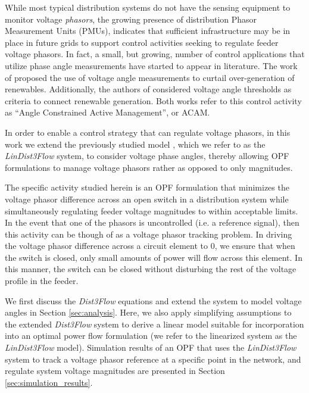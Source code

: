 While most typical distribution systems do not have the sensing equipment to monitor voltage \emph{phasors}, the growing presence of distribution Phasor Measurement Units (PMUs), indicates that sufficient infrastructure may be in place in future grids to support control activities seeking to regulate feeder voltage phasors.  In fact, a small, but growing, number of control applications that utilize phase angle measurements have started to appear in literature.  The work of \cite{ochoa2010angle} proposed the use of voltage angle measurements to curtail over-generation of renewables.  Additionally, the authors of \cite{wang2013pmu} considered voltage angle thresholds as criteria to connect renewable generation.  Both works refer to this control activity as ``Angle Constrained Active Management'', or ACAM.

In order to enable a control strategy that can regulate voltage phasors, in this work we extend the previously studied model \cite{arnold2015optimal}, \cite{sankur2016linear} which we refer to as the \emph{LinDist3Flow} system, to consider voltage phase angles, thereby allowing OPF formulations to manage voltage phasors rather as opposed to only magnitudes.  

The specific activity studied herein is an OPF formulation that minimizes the voltage phasor difference across an open switch in a distribution system while simultaneously regulating feeder voltage magnitudes to within acceptable limits.  In the event that one of the phasors is uncontrolled (i.e. a reference signal), then this activity can be though of as a voltage phasor tracking problem.  In driving the voltage phasor difference across a circuit element to 0, we ensure that when the switch is closed, only small amounts of power will flow across this element.  In this manner, the switch can be closed without disturbing the rest of the voltage profile in the feeder.  

We first discuss the \emph{Dist3Flow} equations and extend the system to model voltage angles in Section \ref{sec:analysis}.  Here, we also apply simplifying assumptions to the extended \emph{Dist3Flow} system to derive a linear model suitable for incorporation into an optimal power flow formulation (we refer to the linearized system as the \emph{LinDist3Flow} model).  Simulation results of an OPF that uses the \emph{LinDist3Flow} system to track a voltage phasor reference at a specific point in the network, and regulate system voltage magnitudes are presented in Section \ref{sec:simulation_results}.

